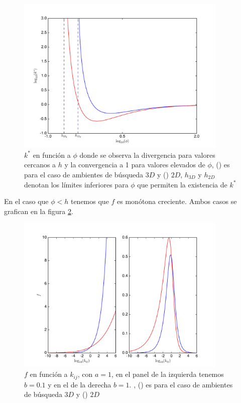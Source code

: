 \begin{figure}
\begin{center}
 \includegraphics[width=0.9\textwidth]{./Plots/kmaxGrazing.pdf}
 \caption[$k^*, Grazing$]{$k^*$ en funci\'on a $\phi$ donde se observa la divergencia para valores cercanos a $h$ y la convergencia a 1 para valores elevados de $\phi$, ({\hwplotB}) es para el caso de ambientes de b\'usqueda $3D$ y ({\hwplotR}) $2D$, $h_{3D}$ y $h_{2D}$ denotan los l\'imites inferiores para $\phi$ que permiten la existencia de $k^*$}
 \label{fig:kmaxGrazing} 
\end{center}
\end{figure}



En el caso que $\phi < h$ tenemos que $f$ es mon\'otona creciente. Ambos casos se grafican en la figura \ref{fig:f1Grazing}.

\begin{figure}
\begin{center}
 \includegraphics[width=0.9\textwidth]{./Plots/f1Grazing.pdf}
 \caption[$f_1, Grazing$]{$f$ en funci\'on a $k_{ij}$, con $a =1$, en el panel de la izquierda tenemos $b = 0.1$ y en el de la derecha $b=1.$ , ({\hwplotB}) es para el caso de ambientes de b\'usqueda $3D$ y ({\hwplotR}) $2D$}
 \label{fig:f1Grazing} 
\end{center}
\end{figure}

